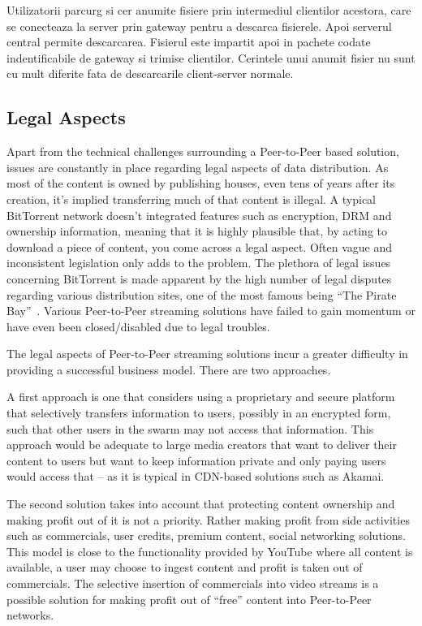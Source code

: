 Utilizatorii parcurg si cer anumite fisiere prin intermediul clientilor
acestora, care se conecteaza la server prin gateway pentru a descarca
fisierele. Apoi serverul central permite descarcarea. Fisierul este impartit
apoi in pachete codate indentificabile de gateway si trimise clientilor.
Cerintele unui anumit fisier nu sunt cu mult diferite fata de descarcarile
client-server normale.

\subsection{Legal Aspects}
\label{subsec:p2p-streaming-legal}

Apart from the technical challenges surrounding a Peer-to-Peer based solution,
issues are constantly in place regarding legal aspects of data distribution.
As most of the content is owned by publishing houses, even tens of years after
its creation, it's implied transferring much of that content is illegal. A
typical BitTorrent network doesn't integrated features such as encryption, DRM
and ownership information, meaning that it is highly plausible that, by acting
to download a piece of content, you come across a legal aspect. Often vague
and inconsistent legislation only adds to the problem. The plethora of legal
issues concerning BitTorrent is made apparent by the high number of legal
disputes regarding various distribution sites, one of the most famous being
``The Pirate Bay''~\cite{pirate-bay}. Various Peer-to-Peer streaming solutions have
failed to gain momentum or have even been closed/disabled due to legal
troubles.

The legal aspects of Peer-to-Peer streaming solutions incur a greater
difficulty in providing a successful business model. There are two approaches.

A first approach is one that considers using a proprietary and secure platform
that selectively transfers information to users, possibly in an encrypted
form, such that other users in the swarm may not access that information. This
approach would be adequate to large media creators that want to deliver their
content to users but want to keep information private and only paying users
would access that -- as it is typical in CDN-based solutions such as Akamai.

The second solution takes into account that protecting content ownership and
making profit out of it is not a priority. Rather making profit from side
activities such as commercials, user credits, premium content, social
networking solutions. This model is close to the functionality provided by
YouTube where all content is available, a user may choose to ingest content
and profit is taken out of commercials. The selective insertion of commercials
into video streams is a possible solution for making profit out of ``free''
content into Peer-to-Peer networks.

